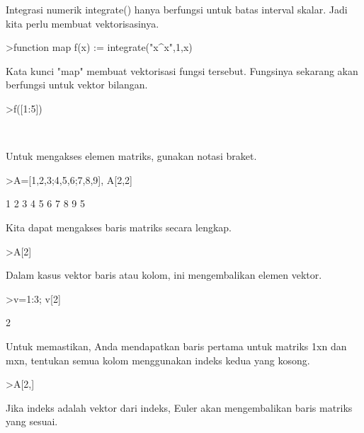 \begin{eulernotebook}
\begin{eulercomment}
\begin{eulercomment}
\begin{eulercomment}
Integrasi numerik integrate() hanya berfungsi untuk batas interval
skalar. Jadi kita perlu membuat vektorisasinya.
\end{eulercomment}
\begin{eulerprompt}
>function map f(x) := integrate("x^x",1,x)
\end{eulerprompt}
\begin{eulercomment}
Kata kunci "map" membuat vektorisasi fungsi tersebut. Fungsinya
sekarang akan berfungsi untuk vektor bilangan.
\end{eulercomment}
\begin{eulerprompt}
>f([1:5])
\end{eulerprompt}
\begin{euleroutput}
  [0,  2.05045,  13.7251,  113.336,  1241.03]\\
  
\end{euleroutput}
\begin{eulercomment}
Untuk mengakses elemen matriks, gunakan notasi braket.
\end{eulercomment}
\begin{eulerprompt}
>A=[1,2,3;4,5,6;7,8,9], A[2,2]
\end{eulerprompt}
\begin{euleroutput}
              1             2             3 
              4             5             6 
              7             8             9 
  5
\end{euleroutput}
\begin{eulercomment}
Kita dapat mengakses baris matriks secara lengkap.
\end{eulercomment}
\begin{eulerprompt}
>A[2]
\end{eulerprompt}
\begin{euleroutput}
  [4,  5,  6]
\end{euleroutput}
\begin{eulercomment}
Dalam kasus vektor baris atau kolom, ini mengembalikan elemen vektor.
\end{eulercomment}
\begin{eulerprompt}
>v=1:3; v[2]
\end{eulerprompt}
\begin{euleroutput}
  2
\end{euleroutput}
\begin{eulercomment}
Untuk memastikan, Anda mendapatkan baris pertama untuk matriks 1xn dan
mxn, tentukan semua kolom menggunakan indeks kedua yang kosong.
\end{eulercomment}
\begin{eulerprompt}
>A[2,]
\end{eulerprompt}
\begin{euleroutput}
  [4,  5,  6]
\end{euleroutput}
\begin{eulercomment}
Jika indeks adalah vektor dari indeks, Euler akan mengembalikan baris
matriks yang sesuai.


\end{eulercomment}
\end{eulercomment}
\end{eulercomment}
\end{eulernotebook}

